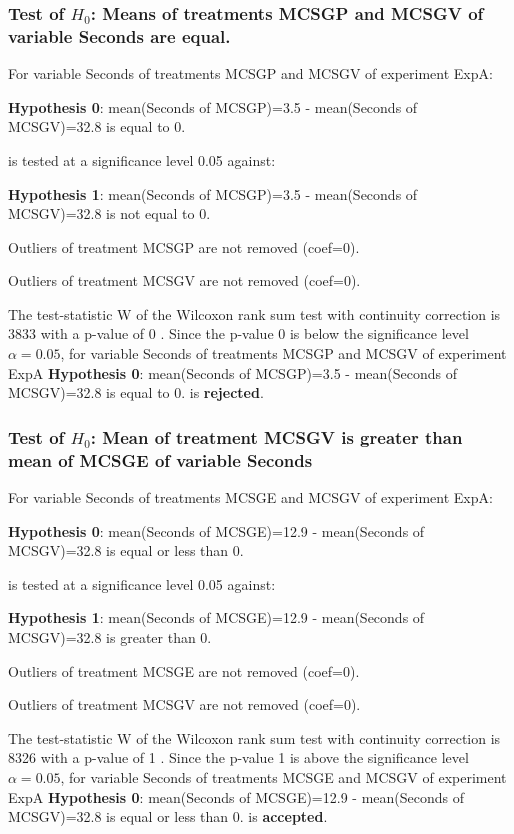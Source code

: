 \documentclass[18pt,c]{beamer}
\begin{document}
\begin{frame}[t]
 \frametitle{Test of $H_{0}$: Means of treatments MCSGP and MCSGV of variable Seconds are equal. }
 \scriptsize
 For variable Seconds of treatments MCSGP and MCSGV of experiment ExpA:

\vspace{1mm}
{\bf Hypothesis 0}: mean(Seconds of MCSGP)=3.5 - mean(Seconds of MCSGV)=32.8 is equal to 0.


 \begin{center} is tested at a significance level 0.05 against: \end{center}

{\bf Hypothesis 1}: mean(Seconds of MCSGP)=3.5 - mean(Seconds of MCSGV)=32.8 is not equal to 0.
\vspace{1mm}
\vspace{1mm}

 Outliers of treatment MCSGP  are not removed (coef=0).

 Outliers of treatment MCSGV  are not removed (coef=0).
\vspace{1mm}
 
 The test-statistic W of the Wilcoxon rank sum test with continuity correction is 3833 with a p-value of 0 .
 Since the p-value 0 is below the significance level $\alpha= 0.05 $,
 for variable Seconds of treatments MCSGP and MCSGV of experiment ExpA 
 {\bf Hypothesis 0}: mean(Seconds of MCSGP)=3.5 - mean(Seconds of MCSGV)=32.8 is equal to 0.
is {\bf rejected}.

 \end{frame}
\begin{frame}[t]
 \frametitle{Test of $H_{0}$: Mean of treatment MCSGV is greater than mean of MCSGE of variable Seconds }
 \scriptsize
 For variable Seconds of treatments MCSGE and MCSGV of experiment ExpA:

\vspace{1mm}
{\bf Hypothesis 0}: mean(Seconds of MCSGE)=12.9 - mean(Seconds of MCSGV)=32.8 is equal or less than 0.


 \begin{center} is tested at a significance level 0.05 against: \end{center}

{\bf Hypothesis 1}: mean(Seconds of MCSGE)=12.9 - mean(Seconds of MCSGV)=32.8 is greater than 0.
\vspace{1mm}
\vspace{1mm}

 Outliers of treatment MCSGE  are not removed (coef=0).

 Outliers of treatment MCSGV  are not removed (coef=0).
\vspace{1mm}
 
 The test-statistic W of the Wilcoxon rank sum test with continuity correction is 8326 with a p-value of 1 .
 Since the p-value 1 is above the significance level $\alpha= 0.05 $,
 for variable Seconds of treatments MCSGE and MCSGV of experiment ExpA 
 {\bf Hypothesis 0}: mean(Seconds of MCSGE)=12.9 - mean(Seconds of MCSGV)=32.8 is equal or less than 0.
is {\bf accepted}.

 \end{frame}
\end{document}
